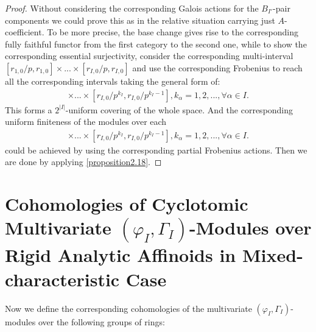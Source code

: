 \documentclass[12pt]{amsart}
\theoremstyle{definition}
\numberwithin{equation}{section}
\begin{document}
\begin{proof}
Without considering the corresponding Galois actions for the $B_{I'}$-pair components we could prove this as in the relative situation carrying just $A$-coefficient. To be more precise, the base change gives rise to the corresponding fully faithful functor from the first category to the second one, while to show the corresponding essential surjectivity, consider the corresponding multi-interval $[r_{1,0}/p,r_{1,0}]\times...\times [r_{I,0}/p,r_{I,0}]$ and use the corresponding Frobenius to reach all the corresponding intervals taking the general form of:
\begin{align}
[r_{1,0}/p^{k_1},r_{1,0}/p^{k_1-1}]\times...\times [r_{I,0}/p^{k_I},r_{I,0}/p^{k_I-1}],k_\alpha=1,2,...,\forall\alpha\in I.	
\end{align}
This forms a $2^{|I|}$-uniform covering of the whole space. And the corresponding uniform finiteness of the modules over each 
\begin{align}
[r_{1,0}/p^{k_1},r_{1,0}/p^{k_1-1}]\times...\times [r_{I,0}/p^{k_I},r_{I,0}/p^{k_I-1}],k_\alpha=1,2,...,\forall\alpha\in I.	
\end{align}	
could be achieved by using the corresponding partial Frobenius actions. Then we are done by applying \cref{proposition2.18}. 	
\end{proof}


\newpage

\section{Cohomologies of Cyclotomic Multivariate $(\varphi_I,\Gamma_I)$-Modules over Rigid Analytic Affinoids in Mixed-characteristic Case}





\noindent Now we define the corresponding cohomologies of the multivariate $(\varphi_I,\Gamma_I)$-modules over the following groups of rings:
\end{document}
